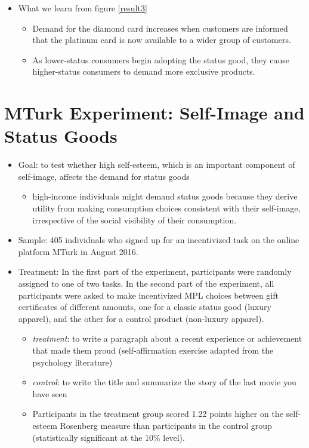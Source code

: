 \documentclass[../root]{subfiles}
\begin{document}
    \begin{itemize}
        \item What we learn from figure \ref{result3}
        \begin{itemize}
            \item Demand for the diamond card increases when customers are informed that the platinum card is now available to a wider group of customers.
            \item As lower-status consumers begin adopting the status good, they cause higher-status consumers to demand more exclusive products.
        \end{itemize}
    \end{itemize}


    \section{MTurk Experiment: Self-Image and Status Goods}

    \begin{itemize}
        \item Goal: to test whether high self-esteem, which is an important component of self-image, affects the demand for status goods
        \begin{itemize}
            \item high-income individuals might demand status goods because they derive utility from making consumption choices consistent with their self-image, irrespective of the social visibility of their consumption. 
        \end{itemize}
        \item Sample: 405 individuals who signed up for an incentivized task on the online platform MTurk in August 2016.
        \item Treatment: In the first part of the experiment, participants were randomly assigned to one of two tasks. In the second part of the experiment, all participants were asked to make incentivized MPL choices between gift certificates of different amounts, one for a classic status good (luxury apparel), and the other for a control product (non-luxury apparel).
        \begin{itemize}
            \item \textit{treatment}: to write a paragraph about a recent experience or achievement that made them proud (self-affirmation exercise adapted from the psychology literature)
            \item \textit{control}: to write the title and summarize the story of the last movie you have seen
            \item Participants in the treatment group scored 1.22 points higher on the self-esteem Rosenberg measure than participants in the control group (statistically significant at the 10\% level).
        \end{itemize}
    \end{itemize}
\end{document}
